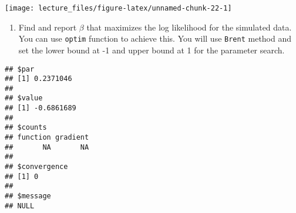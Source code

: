 \documentclass[
]{book}
\newenvironment{Shaded}{\begin{snugshade}}{\end{snugshade}}
\newcommand{\AttributeTok}[1]{\textcolor[rgb]{0.13,0.29,0.53}{#1}}
\newcommand{\DecValTok}[1]{\textcolor[rgb]{0.00,0.00,0.81}{#1}}
\newcommand{\FloatTok}[1]{\textcolor[rgb]{0.00,0.00,0.81}{#1}}
\newcommand{\FunctionTok}[1]{\textcolor[rgb]{0.13,0.29,0.53}{\textbf{#1}}}
\newcommand{\NormalTok}[1]{#1}
\newcommand{\OtherTok}[1]{\textcolor[rgb]{0.56,0.35,0.01}{#1}}
\newcommand{\SpecialCharTok}[1]{\textcolor[rgb]{0.81,0.36,0.00}{\textbf{#1}}}
\newcommand{\StringTok}[1]{\textcolor[rgb]{0.31,0.60,0.02}{#1}}
\providecommand{\tightlist}{%
  \setlength{\itemsep}{0pt}\setlength{\parskip}{0pt}}
\begin{document}
\begin{Shaded}
\end{Shaded}

\begin{center}\texttt{[image: lecture\_files/figure-latex/unnamed-chunk-22-1]} \end{center}

\begin{enumerate}
\def\labelenumi{\arabic{enumi}.}
\tightlist
\item
  Find and report \(\beta\) that maximizes the log likelihood for the simulated data. You can use \texttt{optim} function to achieve this. You will use \texttt{Brent} method and set the lower bound at -1 and upper bound at 1 for the parameter search.
\end{enumerate}

\begin{verbatim}
## $par
## [1] 0.2371046
## 
## $value
## [1] -0.6861689
## 
## $counts
## function gradient 
##       NA       NA 
## 
## $convergence
## [1] 0
## 
## $message
## NULL
\end{verbatim}
\end{document}
